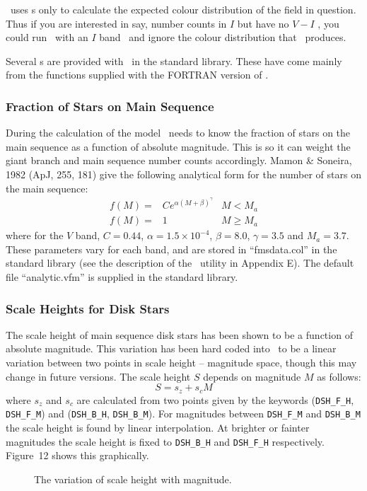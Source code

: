 \documentclass[11pt,twoside]{article}
\begin{document}
\bsm\ uses \cmd s only to calculate the expected colour distribution of the
field in question. Thus if you are interested in say, number counts in $I$
but have no $V-I$ \cmd, you could run \bsm\ with an $I$ band \lf\ and ignore 
the colour distribution that \bsm\ produces.

Several \cmd s are provided with \bsm\ in the standard library. These have
come mainly from the functions supplied with the FORTRAN version of \bsm.

\subsubsection*{Fraction of Stars on Main Sequence}

During the calculation of the model \bsm\ needs to know the fraction of
stars on the main sequence as a function of absolute magnitude. This is
so it can weight the giant branch and main sequence number counts
accordingly. Mamon \& Soneira, 1982 (ApJ, 255, 181) give the following
analytical form for the number of stars on the main sequence:
\[
\begin{array}{lll}
f(M) = & C e^{\alpha(M+\beta)^{\gamma}} & M < M_a \\
f(M) = & 1 & M \geq M_a
\end{array}
\]
where for the $V$ band, $C=0.44$, $\alpha = 1.5\times10^{-4}$, $\beta=8.0$,
$\gamma=3.5$ and $M_a = 3.7$. These parameters vary for each band, and are
stored in ``fmsdata.col'' in the standard library (see the description of
the \mkfms\ utility in Appendix E). The default file ``analytic.vfm'' is
supplied in the standard library.

\subsubsection*{Scale Heights for Disk Stars}

The scale height of main sequence disk stars has been shown to be a function 
of absolute magnitude. This variation has been hard coded into \bsm\ to be a
linear variation between two points in scale height --  magnitude space, 
though this may change in future versions. The scale height $S$ depends on 
magnitude $M$ as follows:
\[
S = s_z + s_c M
\]
where $s_z$ and $s_c$ are calculated from two points given by the keywords
({\tt DSH\_F\_H}, {\tt DSH\_F\_M}) and ({\tt DSH\_B\_H}, {\tt DSH\_B\_M}). 
For magnitudes between {\tt DSH\_F\_M} and {\tt DSH\_B\_M} the scale height is
found by linear interpolation. At brighter or fainter magnitudes the scale 
height is fixed to {\tt DSH\_B\_H} and {\tt DSH\_F\_H} respectively. 
Figure~12 shows this graphically.
\begin{figure}[t]
\centerline{}
\caption{The variation of scale height with magnitude.}
\end{figure}
\end{document}
